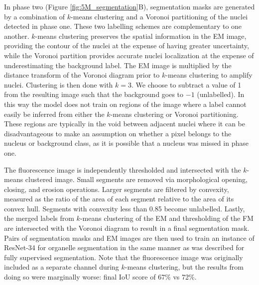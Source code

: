 In phase two (Figure \ref{fig:5M_segmentation}B), segmentation masks are generated by a combination of $k$-means clustering and a Voronoi partitioning of the nuclei detected in phase one. These two labelling schemes are complementary to one another. $k$-means clustering preserves the spatial information in the EM image, providing the contour of the nuclei at the expense of having greater uncertainty, while the Voronoi partition provides accurate nuclei localization at the expense of underestimating the background label. The EM image is multiplied by the distance transform of the Voronoi diagram prior to $k$-means clustering to amplify nuclei. Clustering is then done with $k=\text{3}$. We choose to subtract a value of 1 from the resulting image such that the background goes to $-\text{1}$ (unlabelled). In this way the model does not train on regions of the image where a label cannot easily be inferred from either the $k$-means clustering or Voronoi partitioning. These regions are typically in the void between adjacent nuclei where it can be disadvantageous to make an assumption on whether a pixel belongs to the nucleus or background class, as it is possible that a nucleus was missed in phase one.

The fluorescence image is independently thresholded and intersected with the $k$-means clustered image. Small segments are removed via morphological opening, closing, and erosion operations. Larger segments are filtered by convexity, measured as the ratio of the area of each segment relative to the area of its convex hull. Segments with convexity less than 0.85 become unlabelled. Lastly, the merged labels from $k$-means clustering of the EM and thresholding of the FM are intersected with the Voronoi diagram to result in a final segmentation mask. Pairs of segmentation masks and EM images are then used to train an instance of ResNet-34 for organelle segmentation in the same manner as was described for fully supervised segmentation. Note that the fluorescence image was originally included as a separate channel during $k$-means clustering, but the results from doing so were marginally worse: final IoU score of 67\% vs 72\%.
